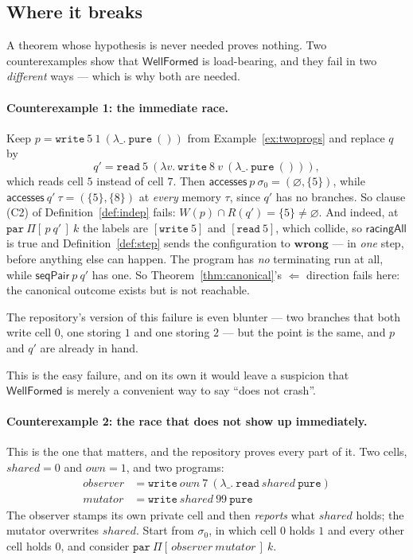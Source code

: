 \documentclass[11pt,a4paper]{article}
\theoremstyle{definition}
\theoremstyle{plain}
\theoremstyle{remark}
\newcommand{\st}{\sigma}
\newcommand{\reads}[1]{R(#1)}
\newcommand{\writes}[1]{W(#1)}
\newcommand{\acc}{\mathsf{accesses}}
\newcommand{\wf}{\mathsf{WellFormed}}
\newcommand{\wrong}{\mathbf{wrong}}
\begin{document}
\subsection{Where it breaks}\label{sec:recap:break}

A theorem whose hypothesis is never needed proves nothing. Two counterexamples show that
$\wf$ is load-bearing, and they fail in two \emph{different} ways --- which is why both are
needed.

\paragraph{Counterexample 1: the immediate race.}
Keep $p = \texttt{write}\ 5\ 1\ (\lambda\_.\ \texttt{pure}\ ())$ from
Example~\ref{ex:twoprogs} and replace $q$ by
\[
  q' = \texttt{read}\ 5\ (\lambda v.\ \texttt{write}\ 8\ v\ (\lambda\_.\ \texttt{pure}\ ())),
\]
which reads cell $5$ instead of cell $7$. Then
$\acc\ p\ \st_0 = (\varnothing, \{5\})$, while $\acc\ q'\ \tau = (\{5\}, \{8\})$ at
\emph{every} memory $\tau$, since $q'$ has no branches. So clause (C2) of
Definition~\ref{def:indep} fails:
$\writes{p} \cap \reads{q'} = \{5\} \neq \varnothing$. And indeed, at
$\texttt{par}\ \Pi[\,p\ q'\,]\ k$ the labels are $[\texttt{write}\ 5]$ and
$[\texttt{read}\ 5]$, which collide, so $\mathsf{racingAll}$ is true and
Definition~\ref{def:step} sends the configuration to $\wrong$ --- in \emph{one} step, before
anything else can happen. The program has \emph{no} terminating run at all, while
$\mathsf{seqPair}\ p\ q'$ has one. So Theorem~\ref{thm:canonical}'s $\Longleftarrow$ direction
fails here: the canonical outcome exists but is not reachable.

The repository's version of this failure is even blunter --- two branches that both write
cell $0$, one storing $1$ and one storing $2$ --- but the point is the same, and $p$ and $q'$
are already in hand.

This is the easy failure, and on its own it would leave a suspicion that $\wf$ is merely a
convenient way to say ``does not crash''.

\paragraph{Counterexample 2: the race that does not show up immediately.}
This is the one that matters, and the repository proves every part of it. Two cells,
$\mathit{shared} = 0$ and $\mathit{own} = 1$, and two programs:
\begin{align*}
  \mathit{observer} &= \texttt{write}\ \mathit{own}\ 7\ (\lambda\_.\ \texttt{read}\ \mathit{shared}\ \texttt{pure}) \\
  \mathit{mutator}  &= \texttt{write}\ \mathit{shared}\ 99\ \texttt{pure}
\end{align*}
The observer stamps its own private cell and then \emph{reports} what $\mathit{shared}$ holds;
the mutator overwrites $\mathit{shared}$. Start from $\st_0$, in which cell $0$ holds $1$ and
every other cell holds $0$, and consider
$\texttt{par}\ \Pi[\,\mathit{observer}\ \mathit{mutator}\,]\ k$.
\end{document}
